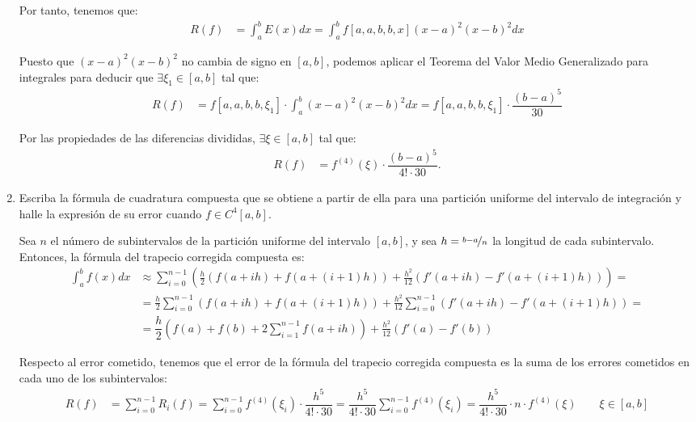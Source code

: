 \begin{ejercicio}
\begin{enumerate}
        Por tanto, tenemos que:
        \begin{align*}
            R(f) &= \int_{a}^{b} E(x) dx = \int_{a}^{b} f[a,a,b,b,x](x - a)^2(x - b)^2 dx
        \end{align*}

        Puesto que $(x - a)^2(x - b)^2$ no cambia de signo en $[a, b]$, podemos aplicar el Teorema del Valor Medio Generalizado para integrales para deducir que $\exists \xi_1 \in [a, b]$ tal que:
        \begin{align*}
            R(f) &= f[a,a,b,b,\xi_1]\cdot \int_{a}^{b} (x - a)^2(x - b)^2 dx
            = f[a,a,b,b,\xi_1]\cdot \dfrac{(b - a)^5}{30}
        \end{align*}

        Por las propiedades de las diferencias divididas, $\exists \xi \in [a, b]$ tal que:
        \begin{align*}
            R(f) &= f^{(4)}(\xi)\cdot \dfrac{(b - a)^5}{4!\cdot 30}.
        \end{align*}
        \item Escriba la fórmula de cuadratura compuesta que se obtiene a partir de ella para una partición uniforme del intervalo de integración y halle la expresión de su error cuando $f \in C^4[a, b]$.
        
        Sea $n$ el número de subintervalos de la partición uniforme del intervalo $[a, b]$, y sea $h = \nicefrac{b-a}{n}$ la longitud de cada subintervalo. 
        Entonces, la fórmula del trapecio corregida compuesta es:
        \begin{align*}
            \int_{a}^{b} f(x) dx &\approx \sum_{i=0}^{n-1} \left( \frac{h}{2}\left( f(a + ih) + f(a + (i+1)h) \right) + \frac{h^2}{12}\left( f'(a + ih) - f'(a + (i+1)h) \right) \right)
            =\\&= \frac{h}{2}\sum_{i=0}^{n-1} (f(a + ih) + f(a + (i+1)h)) + \frac{h^2}{12}\sum_{i=0}^{n-1} (f'(a + ih) - f'(a + (i+1)h))
            =\\&= \dfrac{h}{2}\left( f(a) + f(b) + 2\sum_{i=1}^{n-1} f(a + ih) \right) + \frac{h^2}{12}\left( f'(a) - f'(b)\right)
        \end{align*}

        Respecto al error cometido, tenemos que el error de la fórmula del trapecio corregida compuesta es la suma de los errores cometidos en cada uno de los subintervalos:
        \begin{align*}
            R(f) &= \sum_{i=0}^{n-1} R_i(f) = \sum_{i=0}^{n-1} f^{(4)}(\xi_i)\cdot \dfrac{h^5}{4!\cdot 30} = \dfrac{h^5}{4!\cdot 30} \sum_{i=0}^{n-1} f^{(4)}(\xi_i)
            = \dfrac{h^5}{4!\cdot 30}\cdot n\cdot f^{(4)}(\xi)\qquad \xi \in [a, b]
        \end{align*}


\end{enumerate}
\end{ejercicio}
